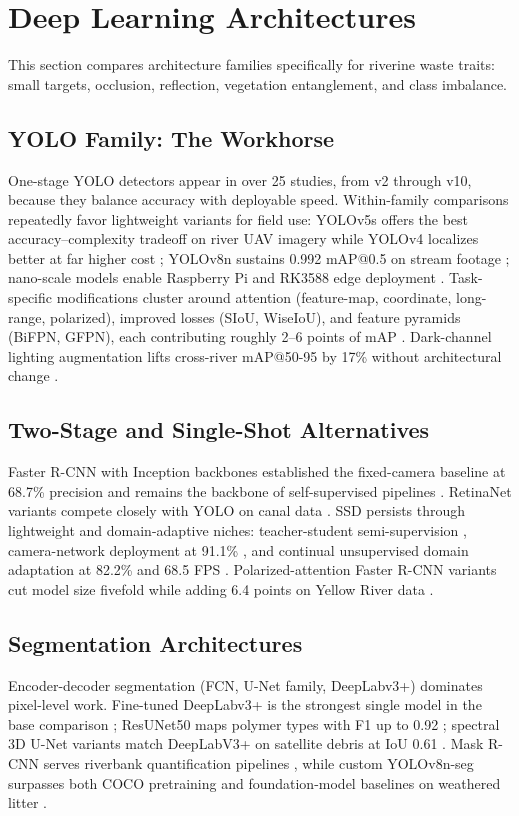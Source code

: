 \section{Deep Learning Architectures}
\label{sec:architectures}

This section compares architecture families specifically for riverine waste traits: small targets, occlusion, reflection, vegetation entanglement, and class imbalance.

\subsection{YOLO Family: The Workhorse}
One-stage YOLO detectors appear in over 25 studies, from v2 through v10, because they balance accuracy with deployable speed. Within-family comparisons repeatedly favor lightweight variants for field use: YOLOv5s offers the best accuracy--complexity tradeoff on river UAV imagery while YOLOv4 localizes better at far higher cost \cite{Maharjan2022}; YOLOv8n sustains 0.992 mAP@0.5 on stream footage \cite{Lee2025}; nano-scale models enable Raspberry Pi and RK3588 edge deployment \cite{Sio2022,Yan2025}. Task-specific modifications cluster around attention (feature-map, coordinate, long-range, polarized), improved losses (SIoU, WiseIoU), and feature pyramids (BiFPN, GFPN), each contributing roughly 2--6 points of mAP \cite{Lin2021,Yang2022,Peng2024,Chen2023}. Dark-channel lighting augmentation lifts cross-river mAP@50-95 by 17\% without architectural change \cite{Saddi2024}.

\subsection{Two-Stage and Single-Shot Alternatives}
Faster R-CNN with Inception backbones established the fixed-camera baseline at 68.7\% precision \cite{Lieshout2020} and remains the backbone of self-supervised pipelines \cite{JiaSwAV2024}. RetinaNet variants compete closely with YOLO on canal data \cite{Tharani2021}. SSD persists through lightweight and domain-adaptive niches: teacher-student semi-supervision \cite{Sun2025}, camera-network deployment at 91.1\% \cite{Renfei2023}, and continual unsupervised domain adaptation at 82.2\% and 68.5 FPS \cite{EAAI2023}. Polarized-attention Faster R-CNN variants cut model size fivefold while adding 6.4 points on Yellow River data \cite{MPFasterRCNN2024}.

\subsection{Segmentation Architectures}
Encoder-decoder segmentation (FCN, U-Net family, DeepLabv3+) dominates pixel-level work. Fine-tuned DeepLabv3+ is the strongest single model in the base comparison \cite{Pati2025}; ResUNet50 maps polymer types with F1 up to 0.92 \cite{Jakovljevic2020}; spectral 3D U-Net variants match DeepLabV3+ on satellite debris at IoU 0.61 \cite{SoleGomez2022}. Mask R-CNN serves riverbank quantification pipelines \cite{Trinh2022}, while custom YOLOv8n-seg surpasses both COCO pretraining and foundation-model baselines on weathered litter \cite{Pan2024}.


